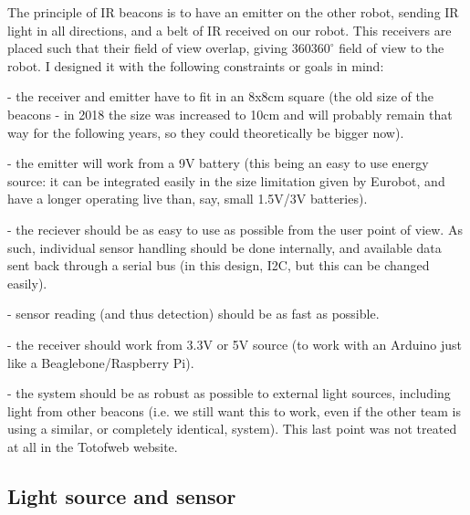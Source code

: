 \documentclass[a4paper,11pt]{article}
\begin{document}
The principle of IR beacons is to have an emitter on the other robot, sending IR light in all directions, and a belt of IR received on our robot. This receivers are placed such that their field of view overlap, giving 360$360^\circ$ field of view to the robot. I designed it with the following constraints or goals in mind:

 - the receiver and emitter have to fit in an 8x8cm square (the old size of the beacons - in 2018 the size was increased to 10cm and will probably remain that way for the following years, so they could theoretically be bigger now).
 
 - the emitter will work from a 9V battery (this being an easy to use energy source: it can be integrated easily in the size limitation given by Eurobot, and have a longer operating live than, say, small 1.5V/3V batteries).
 
 - the reciever should be as easy to use as possible from the user point of view. As such, individual sensor handling should be done internally, and available data sent back through a serial bus (in this design, I2C, but this can be changed easily).
 
 - sensor reading (and thus detection) should be as fast as possible.
 
 - the receiver should work from 3.3V or 5V source (to work with an Arduino just like a Beaglebone/Raspberry Pi).
 
 - the system should be as robust as possible to external light sources, including light from other beacons (i.e. we still want this to work, even if the other team is using a similar, or completely identical, system). This last point was not treated at all in the Totofweb website.
 
 \subsection{Light source and sensor}
\end{document}
